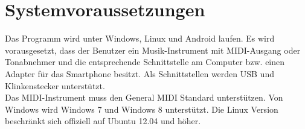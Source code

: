\documentclass[12pt,a4paper]{report}
\begin{document}
    \section{Systemvoraussetzungen}
      Das Programm wird unter Windows, Linux und Android laufen. Es wird vorausgesetzt, dass der Benutzer ein Musik-Instrument mit MIDI-Ausgang oder Tonabnehmer und die entsprechende Schnittstelle am Computer bzw. einen Adapter für das Smartphone besitzt.
      Als Schnittstellen werden USB und Klinkenstecker unterstützt. \\
      Das MIDI-Instrument muss den General MIDI Standard unterstützen. Von Windows wird Windows 7 und Windows 8 unterstützt. Die Linux Version beschränkt sich offiziell auf Ubuntu 12.04 und höher.
\end{document}
